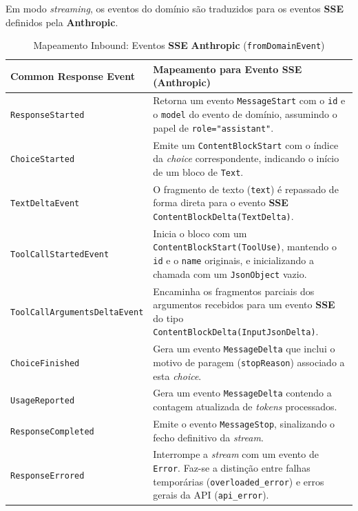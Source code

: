 Em modo \textit{streaming}, os eventos do domínio são traduzidos para os eventos \textbf{SSE} definidos pela \textbf{Anthropic}.
\begin{table}[H]
    \centering
    \footnotesize
    \renewcommand{\arraystretch}{1.25}
    \begin{tabularx}{\textwidth}{|>{\raggedright\arraybackslash}p{4.5cm}|Y|}
        \hline
        \textbf{Common Response Event} & \textbf{Mapeamento para Evento SSE (Anthropic)} \\
        \hline
        \texttt{ResponseStarted} & Retorna um evento \texttt{MessageStart} com o \texttt{id} e o \texttt{model} do evento de domínio, assumindo o papel de \texttt{role="assistant"}. \\
        \hline
        \texttt{ChoiceStarted} & Emite um \texttt{ContentBlockStart} com o índice da \textit{choice} correspondente, indicando o início de um bloco de \texttt{Text}. \\
        \hline
        \texttt{TextDeltaEvent} & O fragmento de texto (\texttt{text}) é repassado de forma direta para o evento \textbf{SSE} \texttt{ContentBlockDelta(TextDelta)}. \\
        \hline
        \texttt{ToolCallStartedEvent} & Inicia o bloco com um \texttt{ContentBlockStart(ToolUse)}, mantendo o \texttt{id} e o \texttt{name} originais, e inicializando a chamada com um \texttt{JsonObject} vazio. \\
        \hline
        \texttt{ToolCallArgumentsDeltaEvent}& Encaminha os fragmentos parciais dos argumentos recebidos para um evento \textbf{SSE} do tipo \texttt{ContentBlockDelta(InputJsonDelta)}. \\
        \hline
        \texttt{ChoiceFinished} & Gera um evento \texttt{MessageDelta} que inclui o motivo de paragem (\texttt{stopReason}) associado a esta \textit{choice}. \\
        \hline
        \texttt{UsageReported} & Gera um evento \texttt{MessageDelta} contendo a contagem atualizada de \textit{tokens} processados. \\
        \hline
        \texttt{ResponseCompleted} & Emite o evento \texttt{MessageStop}, sinalizando o fecho definitivo da \textit{stream}. \\
        \hline
        \texttt{ResponseErrored} & Interrompe a \textit{stream} com um evento de \texttt{Error}. Faz-se a distinção entre falhas temporárias (\texttt{overloaded\_error}) e erros gerais da API (\texttt{api\_error}). \\
        \hline
    \end{tabularx}
    \caption{Mapeamento Inbound: Eventos \textbf{SSE} \textbf{Anthropic} (\texttt{fromDomainEvent})}
\end{table}

